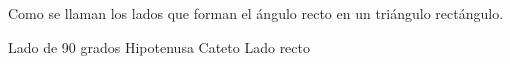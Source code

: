 
\question Como se llaman los lados que forman el ángulo recto en un
          triángulo rectángulo.

  \begin{oneparchoices}
    \choice Lado de 90 grados
    \choice Hipotenusa
    \CorrectChoice Cateto
    \choice Lado recto
  \end{oneparchoices}
  \answerline[C]
